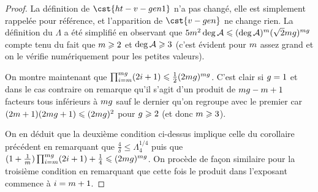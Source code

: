\begin{proof}
  La définition de \( \cst{ht-v-gen1} \) n'a pas changé, elle est simplement
  rappelée pour référence, et l'apparition de \( \cst{v-gen} \) ne change
  rien. La définition du \( \Lambda \) a été simplifié en observant que \(
    5m^2 \deg \mathcal A \leqslant (\deg \mathcal A)^m (\sqrt2
    mg)^{mg} \) compte tenu du fait que \( m \geqslant 2 \)
  et \( \deg \mathcal A \geqslant 3 \) (c'est évident pour \( m \) assez grand et on
  le vérifie numériquement pour les petites valeurs).

  On montre maintenant que \( \prod_{i=m}^{mg} (2i + 1) \leqslant
    \frac12 (2mg)^{mg} \). C'est clair si \( g = 1 \)
  et dans le cas contraire on remarque qu'il s'agit d'un produit de \(
    mg - m + 1 \) facteurs tous inférieurs à \( mg \)
  sauf le dernier qu'on regroupe avec le premier car \( (2m +
    1)(2mg + 1) \leqslant (2mg)^2 \) pour \( g \geqslant 2 \) (et
  donc \( m \geqslant 3 \)).

  On en déduit que la deuxième condition ci-dessus implique celle du
  corollaire précédent en remarquant que \( \frac4\delta \le \Lambda_4^{1/4}
  \) puis que \( (1 + \frac1{m}) \prod_{i=m}^{mg} (2i + 1) +
    \frac14 \leqslant (2mg)^{mg} \). On procède de façon
  similaire pour la troisième condition en remarquant que cette fois le
  produit dans l'exposant commence à \( i = m + 1 \).
\end{proof}


\cleardoublepage
\endinput

